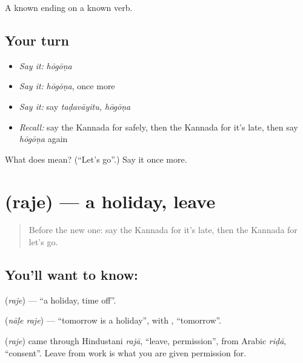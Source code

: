 \begin{grammarlens}[title={What you've built}]
A known ending on a known verb.
\end{grammarlens}

\subsection*{Your turn}
\begin{itemize}
\raggedright
  \item \emph{Say it:} \emph{hōgōṇa}
  \item \emph{Say it:} \emph{hōgōṇa}, once more
  \item \emph{Say it:} say \emph{taḍavāyitu, hōgōṇa}
  \item \emph{Recall:} say the Kannada for safely, then the Kannada for it's late, then say \emph{hōgōṇa} again
\end{itemize}

\begin{tcolorbox}[breakable,colback=teal!4,colframe=teal!35!black,title={Before you move on}]
What does  mean? (\textquotedblleft{}Let's go\textquotedblright{}.) Say it once more.
\end{tcolorbox}
\section[\texorpdfstring{\kn{ರಜೆ} (raje)}{ರಜೆ (raje)}]{ (raje) — a holiday, leave}

\label{lesson:KA-C89-holiday}



\begin{quote}
Before the new one: say the Kannada for it's late, then the Kannada for let's go.
\end{quote}

\subsection*{You'll want to know: }
\textbf{} (\emph{raje}) — \textquotedblleft{}a holiday, time off\textquotedblright{}.

\textbf{ } (\emph{nāḷe raje}) — \textquotedblleft{}tomorrow is a holiday\textquotedblright{}, with \textbf{}, \textquotedblleft{}tomorrow\textquotedblright{}.

\begin{cousinweb}
\textbf{} (\emph{raje}) came through Hindustani \emph{rajā}, \textquotedblleft{}leave, permission\textquotedblright{}, from Arabic \emph{riḍā}, \textquotedblleft{}consent\textquotedblright{}. Leave from work is what you are given permission for.
\end{cousinweb}

